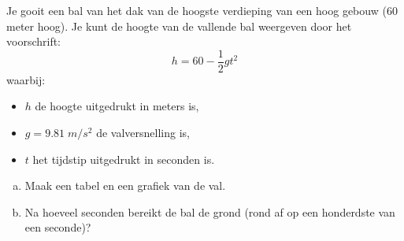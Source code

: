 \documentclass[12pt]{article}
\begin{document}
\begin{oefening}
  Je gooit een bal van het dak van de hoogste verdieping van een hoog gebouw ($60$ meter hoog). Je kunt de hoogte van de vallende bal weergeven door het voorschrift:
  $$h=60-\frac{1}{2}gt^2$$
  waarbij:
  \begin{itemize}
  \item $h$ de hoogte uitgedrukt in meters is,
  \item $g=9.81 \;m/s^2$ de valversnelling is,
  \item $t$ het tijdstip uitgedrukt in seconden is.
  \end{itemize}
  \begin{enumerate}[(a)]
  \item Maak een tabel en een grafiek van de val.
  \item Na hoeveel seconden bereikt de bal de grond (rond af op een honderdste van een seconde)?
  \end{enumerate}
\end{oefening}
\end{document}
